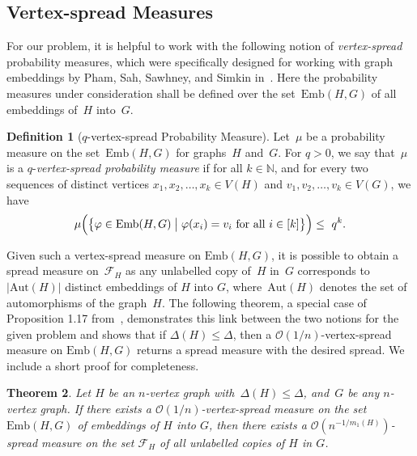 \documentclass[final]{article}
\newtheorem{theorem}{Theorem}[section]
\theoremstyle{definition}
\newtheorem{definition}[theorem]{Definition}
\newcommand{\Emb}{\mathrm{Emb}}
\begin{document}
\subsection{Vertex-spread Measures}

For our problem, it is helpful to work with the following notion of \emph{vertex-spread} probability measures, which were specifically designed for working with graph embeddings by Pham, Sah, Sawhney, and Simkin in~\cite{toolkit_robust_thresholds}. Here the probability measures under consideration shall be defined over the set~$\Emb(H,G)$ of all embeddings of~$H$ into~$G$. 

\begin{definition}[$q$-vertex-spread Probability Measure]
    \label{defn:vtx_spread_measure}
    Let~$\mu$ be a probability measure on the set~$\Emb(H,G)$ for graphs~$H$ and~$G$. For $q > 0$, we say that~$\mu$ is a $q$-\emph{vertex-spread probability measure} if for all $k \in \mathbb{N}$, and for every two sequences of distinct vertices ${x_1, x_2, \dots, x_k \in V(H)}$ and ${v_1, v_2, \dots, v_k \in V(G)}$, we have $$\mu \Bigl(\bigl\{ \varphi \in \Emb(H,G) \bigm| \varphi(x_i) = v_i \text{ for all } i \in [k] \bigr\}\Bigr)  \leq \ q^k.$$
\end{definition}

Given such a vertex-spread measure on $\Emb(H,G)$, it is possible to obtain a spread measure on~$\mathcal{F}_H$ as any unlabelled copy of~$H$ in~$G$ corresponds to $|\mathrm{Aut}(H)|$ distinct embeddings of $H$ into $G$, where~$\mathrm{Aut}(H)$ denotes the set of automorphisms of the graph~$H$. The following theorem, a special case of Proposition 1.17 from~\cite{Alp_robustness_spread}, demonstrates this link between the two notions for the given problem and shows that if $\Delta(H) \leq \Delta$, then a $\mathcal{O}(1/n)$-vertex-spread measure on $\Emb(H,G)$ returns a spread measure with the desired spread. We include a short proof for completeness. 

\begin{theorem}
    \label{thm:vtx_spread_implies_spread}
    Let $H$ be an $n$-vertex graph with~$\Delta(H) \leq \Delta$, and~$G$ be any $n$-vertex graph. If there exists a $\mathcal{O}(1/n)$-vertex-spread measure on the set $\Emb(H,G)$ of embeddings of $H$ into $G$, then there exists a $\mathcal{O}(n^{-1/m_1(H)})$-spread measure on the set $\mathcal{F}_H$ of all unlabelled copies of $H$ in $G$.
\end{theorem} 
\end{document}
